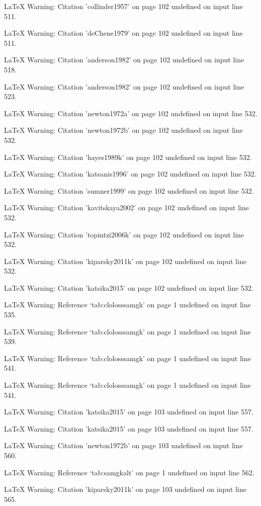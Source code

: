 LaTeX Warning: Citation 'collinder1957' on page 102 undefined on input line 511.


LaTeX Warning: Citation 'deChene1979' on page 102 undefined on input line 511.


LaTeX Warning: Citation 'anderson1982' on page 102 undefined on input line 518.


LaTeX Warning: Citation 'anderson1982' on page 102 undefined on input line 523.


LaTeX Warning: Citation 'newton1972a' on page 102 undefined on input line 532.


LaTeX Warning: Citation 'newton1972b' on page 102 undefined on input line 532.


LaTeX Warning: Citation 'hayes1989k' on page 102 undefined on input line 532.


LaTeX Warning: Citation 'katsanis1996' on page 102 undefined on input line 532.


LaTeX Warning: Citation 'sumner1999' on page 102 undefined on input line 532.


LaTeX Warning: Citation 'kavitskaya2002' on page 102 undefined on input line 532.


LaTeX Warning: Citation 'topintzi2006k' on page 102 undefined on input line 532.


LaTeX Warning: Citation 'kiparsky2011k' on page 102 undefined on input line 532.


LaTeX Warning: Citation 'katsika2015' on page 102 undefined on input line 532.


LaTeX Warning: Reference `tab:clolosssamgk' on page 1 undefined on input line 535.


LaTeX Warning: Reference `tab:clolosssamgk' on page 1 undefined on input line 539.


LaTeX Warning: Reference `tab:clolosssamgk' on page 1 undefined on input line 541.


LaTeX Warning: Reference `tab:clolosssamgk' on page 1 undefined on input line 541.


LaTeX Warning: Citation 'katsika2015' on page 103 undefined on input line 557.


LaTeX Warning: Citation 'katsika2015' on page 103 undefined on input line 557.


LaTeX Warning: Citation 'newton1972b' on page 103 undefined on input line 560.


LaTeX Warning: Reference `tab:samgkalt' on page 1 undefined on input line 562.


LaTeX Warning: Citation 'kiparsky2011k' on page 103 undefined on input line 565.


